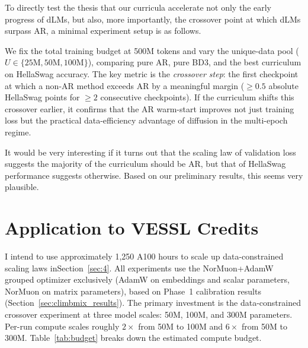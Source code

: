 \documentclass{article}
\begin{document}
To directly test the thesis that our curricula accelerate not only the early progress of dLMs, but also, more importantly, the crossover point at which dLMs surpass AR, a minimal experiment setup is as follows.

We fix the total training budget at 500M tokens and vary the unique-data pool
($U \in \{25\text{M}, 50\text{M}, 100\text{M}\}$), comparing pure AR, pure
BD3, and the best curriculum on HellaSwag accuracy.  The key metric is the \emph{crossover step}: the first checkpoint at which a non-AR method exceeds AR by a meaningful margin ($\geq 0.5$ absolute HellaSwag points for $\geq 2$
consecutive checkpoints).  If the curriculum shifts this crossover earlier, it
confirms that the AR warm-start improves not just training loss but the
practical data-efficiency advantage of diffusion in the multi-epoch regime.

It would be very interesting if it turns out that the scaling law of validation loss suggests the majority of the curriculum should be AR, but that of HellaSwag performance suggests otherwise. Based on our preliminary results, this seems very plausible.
\section{Application to VESSL Credits}
I intend to use approximately 1{,}250 A100 hours to scale up data-constrained scaling laws inSection~\ref{sec:4}.
All experiments use the NorMuon+AdamW grouped optimizer exclusively
(AdamW on embeddings and scalar parameters, NorMuon on matrix parameters),
based on Phase~1 calibration results (Section~\ref{sec:climbmix_results}).
The primary investment is the data-constrained crossover experiment at three
model scales: 50M, 100M, and 300M parameters.  Per-run compute scales
roughly $2\times$ from 50M to 100M and $6\times$ from 50M to 300M.
Table~\ref{tab:budget} breaks down the estimated compute budget.
\end{document}
